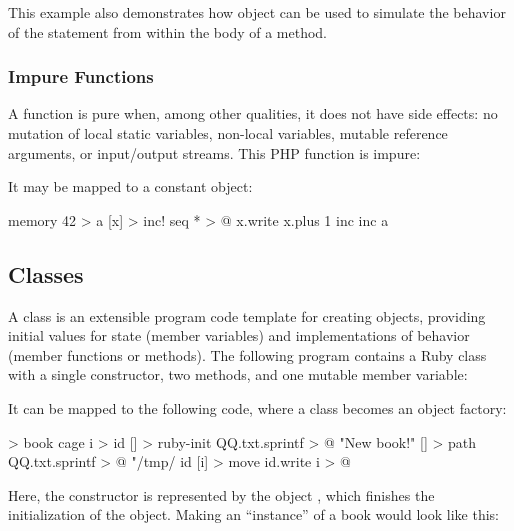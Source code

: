 \documentclass[sigplan,nonacm]{acmart}
\begin{document}
This example also demonstrates how  object can be used to simulate the behavior of the  statement from within the body of a method.

\subsubsection{Impure Functions}

A function is pure when, among other qualities, it does not have side effects:
no mutation of local static variables, non-local variables, mutable reference arguments,
or input/output streams. This PHP function is impure:


It may be mapped to a constant \eolang{} object:

\begin{ffcode}
memory 42 > a
[x] > inc!
  seq * > @
    x.write
      x.plus 1
inc
  inc a
\end{ffcode}

\subsection{Classes}
\label{sec:classes}

A class is an extensible program code template for creating objects, providing initial values for state (member variables) and implementations of behavior (member functions or methods). The following program contains a Ruby class with a single constructor, two methods, and one mutable member variable:


It can be mapped to the following \eolang{} code, where a class becomes an object factory:

\begin{ffcode}
[i] > book
  cage i > id
  [] > ruby-init
    QQ.txt.sprintf > @
      "New book!"
  [] > path
    QQ.txt.sprintf > @
      "/tmp/%
      id
  [i] > move
    id.write i > @
\end{ffcode}

Here, the constructor is represented by the object , which finishes the initialization of the object. Making an ``instance'' of a book would look like this:
\end{document}
